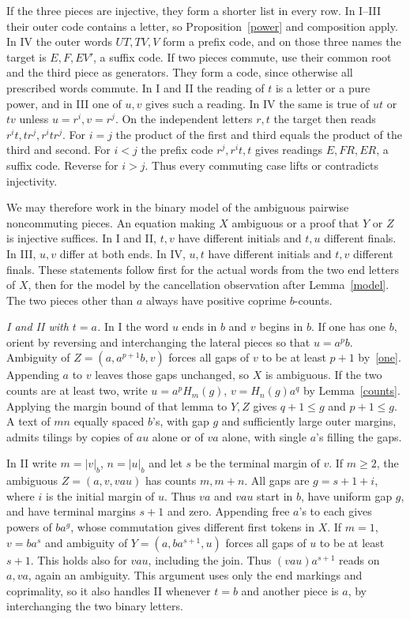 \documentclass[11pt,a4paper]{article}
\newcommand{\bct}[1]{\lvert #1\rvert_b}
\newcommand{\parhead}[1]{\par\smallskip\noindent\textit{#1.}\enspace}
\begin{document}
If the three pieces are injective, they form a shorter list in every row. In I--III their outer code contains a letter, so Proposition~\ref{power} and composition apply. In IV the outer words $UT,TV,V$ form a prefix code, and on those three names the target is $E,F,EV'$, a suffix code. If two pieces commute, use their common root and the third piece as generators. They form a code, since otherwise all prescribed words commute. In I and II the reading of $t$ is a letter or a pure power, and in III one of $u,v$ gives such a reading. In IV the same is true of $ut$ or $tv$ unless $u=r^i,v=r^j$. On the independent letters $r,t$ the target then reads $r^i t,t r^j,r^i t r^j$. For $i=j$ the product of the first and third equals the product of the third and second. For $i<j$ the prefix code $r^j,r^i t,t$ gives readings $E,FR,ER$, a suffix code. Reverse for $i>j$. Thus every commuting case lifts or contradicts injectivity.

We may therefore work in the binary model of the ambiguous pairwise noncommuting pieces. An equation making $X$ ambiguous or a proof that $Y$ or $Z$ is injective suffices. In I and II, $t,v$ have different initials and $t,u$ different finals. In III, $u,v$ differ at both ends. In IV, $u,t$ have different initials and $t,v$ different finals. These statements follow first for the actual words from the two end letters of $X$, then for the model by the cancellation observation after Lemma~\ref{model}. The two pieces other than $a$ always have positive coprime $b$-counts.

\parhead{I and II with $t=a$}
In I the word $u$ ends in $b$ and $v$ begins in $b$. If one has one $b$, orient by reversing and interchanging the lateral pieces so that $u=a^p b$. Ambiguity of $Z=(a,a^{p+1}b,v)$ forces all gaps of $v$ to be at least $p+1$ by~\eqref{one}. Appending $a$ to $v$ leaves those gaps unchanged, so $X$ is ambiguous. If the two counts are at least two, write $u=a^p H_m(g)$, $v=H_n(g)a^q$ by Lemma~\ref{counts}. Applying the margin bound of that lemma to $Y,Z$ gives $q+1\le g$ and $p+1\le g$. A text of $mn$ equally spaced $b$'s, with gap $g$ and sufficiently large outer margins, admits tilings by copies of $au$ alone or of $va$ alone, with single $a$'s filling the gaps.

In II write $m=\bct v$, $n=\bct u$ and let $s$ be the terminal margin of $v$. If $m\ge2$, the ambiguous $Z=(a,v,vau)$ has counts $m,m+n$. All gaps are $g=s+1+i$, where $i$ is the initial margin of $u$. Thus $va$ and $vau$ start in $b$, have uniform gap $g$, and have terminal margins $s+1$ and zero. Appending free $a$'s to each gives powers of $ba^g$, whose commutation gives different first tokens in $X$. If $m=1$, $v=ba^s$ and ambiguity of $Y=(a,ba^{s+1},u)$ forces all gaps of $u$ to be at least $s+1$. This holds also for $vau$, including the join. Thus $(vau)a^{s+1}$ reads on $a,va$, again an ambiguity. This argument uses only the end markings and coprimality, so it also handles II whenever $t=b$ and another piece is $a$, by interchanging the two binary letters.
\end{document}
